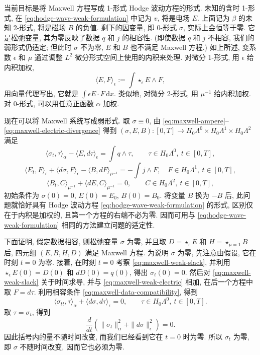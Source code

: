 当前目标是将 Maxwell 方程写成 1-形式 Hodge 波动方程的形式. 未知的含时 1-形式, 在 \eqref{eq:hodge-wave-weak-formulation} 中记为 $v$, 将是电场 $E$. 上面记为 $\beta$ 的未知 2-形式, 将是磁场 $B$ 的负值. 剩下的因变量, 即 0-形式 $\sigma$, 实际上会恒等于零. 它是松弛变量, 其为零反映了数据 $q$ 和 $j$ 的相容性. (即使数据 $q$ 和 $j$ 不相容, 我们的弱形式仍适定; 但此时 $\sigma$ 不为零, $E$ 和 $B$ 也不满足 Maxwell 方程.) 如上所述, 变系数 $\epsilon$ 和 $\mu$ 通过调整 $L^2$ 微分形式空间上使用的内积来处理. 对微分 1-形式, 用 $\epsilon$ 给内积加权,
\[
\langle E,F\rangle_\epsilon:=\int\star_\epsilon E\wedge F,
\]
用向量代理写出, 它就是 $\int\epsilon E\cdot F\,\mathrm{d}x$. 类似地, 对微分 2-形式, 用 $\mu^{-1}$ 给内积加权. 对 0-形式, 可以用任意正函数 $\alpha$ 加权.

现在可以将 Maxwell 系统写成弱形式. 取 $\sigma\equiv0$, 由 \eqref{eq:maxwell-ampere}--\eqref{eq:maxwell-electric-divergence} 得到 $(\sigma,E,B):[0,T]\to H_{0}\Lambda^0\times H_{0}\Lambda^1\times H_{0}\Lambda^2$ 满足
\begin{equation}\label{eq:maxwell-weak-slack}
\langle\sigma_t,\tau\rangle_\alpha-\langle E,d\tau\rangle_\epsilon=\int q\wedge\tau,\qquad\tau\in H_{0}\Lambda^0,\ t\in[0,T],
\end{equation}
\begin{equation}\label{eq:maxwell-weak-electric}
\langle E_t,F\rangle_\epsilon+\langle d\sigma,F\rangle_\epsilon-\langle B,dF\rangle_{\mu^{-1}}=-\int j\wedge F,\quad F\in H_{0}\Lambda^1,\ t\in[0,T],
\end{equation}
\begin{equation}\label{eq:maxwell-weak-magnetic}
\langle B_t,C\rangle_{\mu^{-1}}+\langle dE,C\rangle_{\mu^{-1}}=0,\qquad C\in H_{0}\Lambda^2,\ t\in[0,T],
\end{equation}
初始条件为 $\sigma(0)=0$, $E(0)=E_0$, $B(0)=B_0$. 将变量 $B$ 换为 $-B$ 后, 此问题就恰好具有 Hodge 波动方程 \eqref{eq:hodge-wave-weak-formulation} 的形式, 区别仅在于内积是加权的, 且第一个方程的右端不必为零. 因而可用与 \eqref{eq:hodge-wave-weak-formulation} 相同的方法建立问题的适定性.

下面证明, 假定数据相容, 则松弛变量 $\sigma$ 为零, 并且取 $D=\star_\epsilon E$ 和 $H=\star_{\mu=1}B$ 后, 四元组 $(E,B,H,D)$ 满足 Maxwell 方程. 为说明 $\sigma$ 为零, 先注意由假设, 它在时刻 $t=0$ 为零. 接着, 在时刻 $t=0$ 考察 \eqref{eq:maxwell-weak-slack}, 并利用 $\star_\epsilon E(0)=D(0)$ 和 $dD(0)=q(0)$, 得出 $\sigma_t(0)=0$. 然后对 \eqref{eq:maxwell-weak-slack} 关于时间求导, 并与 \eqref{eq:maxwell-weak-electric} 相加, 在后一个方程中取 $F=d\tau$. 利用相容条件 \eqref{eq:maxwell-data-compatibility}, 得到
\[
\langle\sigma_{tt},\tau\rangle_\alpha+\langle d\sigma,d\tau\rangle_\epsilon=0,\qquad\tau\in H_{0}\Lambda^0,\ t\in[0,T].
\]
取 $\tau=\sigma_t$, 得到
\[
\frac d{dt}(\|\sigma_t\|_\alpha^2+\|d\sigma\|_\epsilon^2)=0.
\]
因此括号内的量不随时间改变, 而我们已经看到它在 $t=0$ 时为零. 所以 $\sigma_t$ 为零, 即 $\sigma$ 不随时间改变, 因而它也必须为零.


